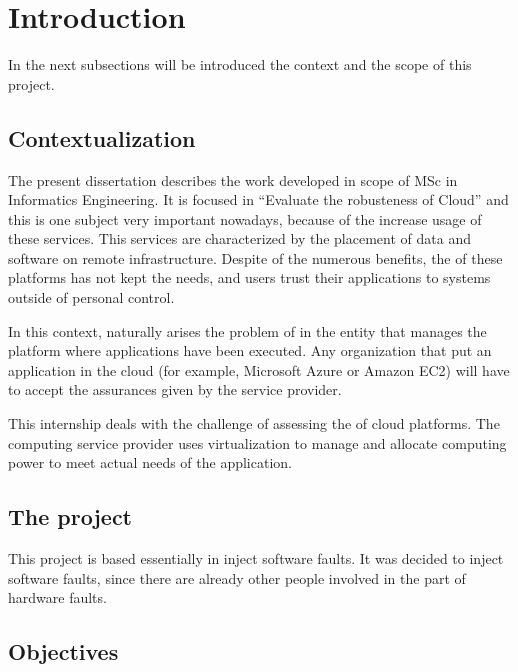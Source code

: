 \newpage
\section{Introduction}

In the next subsections will be introduced the context and the scope of this project.

\subsection{Contextualization}
The present dissertation describes the work developed in scope of MSc in Informatics Engineering. It is focused in ``Evaluate the robusteness of Cloud'' and this is one subject very important nowadays, because of the increase usage of these services.
This services are characterized by the placement of data and software on remote infrastructure. Despite of the numerous benefits, the  of these platforms has not kept the needs, and users trust their applications to systems outside of personal control.

In this context, naturally arises the problem of  in the entity that manages the platform where applications have been executed. Any organization that put an application in the cloud (for example, Microsoft Azure or Amazon EC2) will have to accept the assurances given by the service provider.

This internship deals with the challenge of assessing the  of cloud platforms. The computing service provider uses virtualization to manage and allocate computing power to meet actual needs of the application. 



\subsection{The project}

This project is based essentially in inject software faults. It was decided to inject software faults, since there are already other people involved in the part of hardware faults.

\subsection{Objectives}

